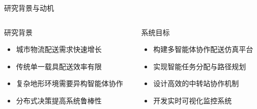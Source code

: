 \documentclass[
10pt,
aspectratio=169,
]{beamer}
\begin{document}
\begin{frame}{研究背景与动机}
    \begin{columns}
        \begin{column}{0.5\textwidth}
            \begin{block}{研究背景}
                \begin{itemize}
                    \item 城市物流配送需求快速增长
                    \item 传统单一载具配送效率有限
                    \item 复杂地形环境需要异构智能体协作
                    \item 分布式决策提高系统鲁棒性
                \end{itemize}
            \end{block}
        \end{column}
        \begin{column}{0.5\textwidth}
            \begin{block}{系统目标}
                \begin{itemize}
                    \item 构建多智能体协作配送仿真平台
                    \item 实现智能任务分配与路径规划
                    \item 设计高效的中转站协作机制
                    \item 开发实时可视化监控系统
                \end{itemize}
            \end{block}
        \end{column}
    \end{columns}
\end{frame}
\end{document}
